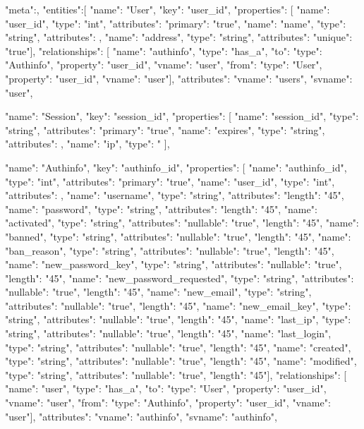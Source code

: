 \documentclass{article}
\begin{document}
{"meta":{},
"entities":[
	{	"name": "User",
		"key": "user\_id",
		"properties": [
			{	"name": "user\_id",
				"type": "int",
				"attributes": {
					"primary": "true"}},
			{	"name": "name",
				"type": "string",
				"attributes": {}},
			{	"name": "address",
				"type": "string",
				"attributes": {
					"unique": "true"}}],
		"relationships": [
			{	"name": "authinfo",
				"type": "has\_a",
				"to": {
					"type": "Authinfo",
					"property": "user\_id",
					"vname": "user"},
				"from": {
					"type": "User",
					"property": "user\_id",
					"vname": "user"}}],
		"attributes": {
			"vname": "users",
			"svname": "user"}},

	{	"name": "Session",
		"key": "session\_id",
		"properties": [
			{	"name": "session\_id",
				"type": "string",
				"attributes": {
					"primary": "true"}},
			{	"name": "expires",
				"type": "string",
				"attributes": {}},
			{	"name": "ip",
				"type": "
		]},

	{	"name": "Authinfo",
		"key": "authinfo\_id",
		"properties": [
			{	"name": "authinfo\_id",
				"type": "int",
				"attributes": {
					"primary": "true"}},
			{	"name": "user\_id",
				"type": "int",
				"attributes": {}},
			{	"name": "username",
				"type": "string",
				"attributes": {
					"length": "45"}},
			{	"name": "password",
				"type": "string",
				"attributes": {
					"length": "45"}},
			{	"name": "activated",
				"type": "string",
				"attributes": {
					"nullable": "true",
					"length": "45"}},
			{	"name": "banned",
				"type": "string",
				"attributes": {
					"nullable": "true",
					"length": "45"}},
			{	"name": "ban\_reason",
				"type": "string",
				"attributes": {
					"nullable": "true",
					"length": "45"}},
			{	"name": "new\_password\_key",
				"type": "string",
				"attributes": {
					"nullable": "true",
					"length": "45"}},
			{	"name": "new\_password\_requested",
				"type": "string",
				"attributes": {
					"nullable": "true",
					"length": "45"}},
			{	"name": "new\_email",
				"type": "string",
				"attributes": {
					"nullable": "true",
					"length": "45"}},
			{	"name": "new\_email\_key",
				"type": "string",
				"attributes": {
					"nullable": "true",
					"length": "45"}},
			{	"name": "last\_ip",
				"type": "string",
				"attributes": {
					"nullable": "true",
					"length": "45"}},
			{	"name": "last\_login",
				"type": "string",
				"attributes": {
					"nullable": "true",
					"length": "45"}},
			{	"name": "created",
				"type": "string",
				"attributes": {
					"nullable": "true",
					"length": "45"}},
			{	"name": "modified",
				"type": "string",
				"attributes": {
					"nullable": "true",
					"length": "45"}}],
		"relationships": [
			{	"name": "user",
				"type": "has\_a",
				"to": {
					"type": "User",
					"property": "user\_id",
					"vname": "user"},
				"from": {
					"type": "Authinfo",
					"property": "user\_id",
					"vname": "user"}}],
		"attributes": {
			"vname": "authinfo",
			"svname": "authinfo"}},

}}
\end{document}
